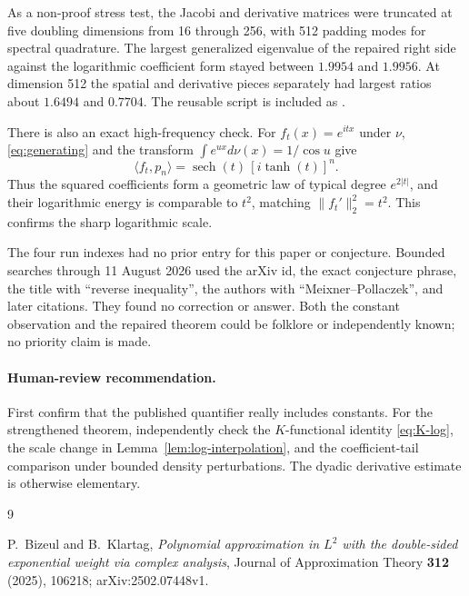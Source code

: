 \documentclass[11pt]{article}
\newcommand{\ip}[2]{\langle #1,#2\rangle}
\begin{document}
As a non-proof stress test, the Jacobi and derivative matrices were truncated
at five doubling dimensions from 16 through 256, with 512 padding modes for spectral
quadrature.  The largest generalized eigenvalue of the repaired right side
against the logarithmic coefficient form stayed between $1.9954$ and
$1.9956$.  At dimension 512 the spatial and derivative pieces separately
had largest ratios about $1.6494$ and $0.7704$.  The reusable script is
included as .

There is also an exact high-frequency check.  For $f_t(x)=e^{itx}$ under
$\nu$, \eqref{eq:generating} and the transform
$\int e^{ux}d\nu(x)=1/\cos u$ give
\[
 \ip{f_t}{p_n}=\operatorname{sech}(t)\,[i\tanh(t)]^n.
\]
Thus the squared coefficients form a geometric law of typical degree
$e^{2|t|}$, and their logarithmic energy is comparable to $t^2$, matching
$\|f_t'\|_2^2=t^2$.  This confirms the sharp logarithmic scale.

The four run indexes had no prior entry for this paper or conjecture.  Bounded
searches through 11 August 2026 used the arXiv id, the exact conjecture phrase,
the title with ``reverse inequality'', the authors with
``Meixner--Pollaczek'', and later citations.  They found no correction or
answer.  Both the constant observation and the repaired theorem could be
folklore or independently known; no priority claim is made.

\paragraph{Human-review recommendation.}
First confirm that the published quantifier really includes constants.  For
the strengthened theorem, independently check the $K$-functional identity
\eqref{eq:K-log}, the scale change in Lemma~\ref{lem:log-interpolation}, and
the coefficient-tail comparison under bounded density perturbations.  The
dyadic derivative estimate is otherwise elementary.

\begin{thebibliography}{9}

P.~Bizeul and B.~Klartag,
\emph{Polynomial approximation in $L^2$ with the double-sided exponential
weight via complex analysis},
Journal of Approximation Theory \textbf{312} (2025), 106218;
arXiv:2502.07448v1.

\end{thebibliography}
\end{document}
